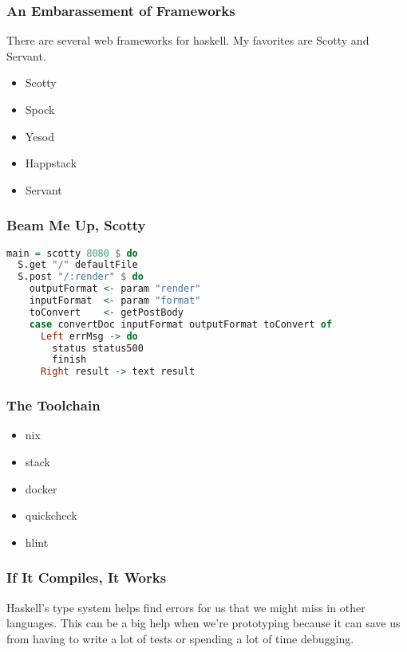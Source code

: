 \documentclass{beamer}
\begin{document}
\begin{frame}
  \frametitle{An Embarassement of Frameworks}
  There are several web frameworks for haskell.  My favorites are
  Scotty and Servant.
  \begin{itemize}
    \item Scotty
    \item Spock
    \item Yesod
    \item Happstack
    \item Servant
  \end{itemize}
\end{frame}

\begin{frame}[fragile]
  \frametitle{Beam Me Up, Scotty}
\begin{lstlisting}[language=haskell]
main = scotty 8080 $ do
  S.get "/" defaultFile
  S.post "/:render" $ do
    outputFormat <- param "render"
    inputFormat  <- param "format"
    toConvert    <- getPostBody
    case convertDoc inputFormat outputFormat toConvert of
      Left errMsg -> do
        status status500
        finish
      Right result -> text result
\end{lstlisting}
\end{frame}

\begin{frame}
  \frametitle{The Toolchain}
  \begin{itemize}
  \item nix
  \item stack
  \item docker
  \item quickcheck
  \item hlint
  \end{itemize}
\end{frame}

\begin{frame}
  \frametitle{If It Compiles, It Works}
  Haskell's type system helps find errors for us that we might miss in
  other languages.  This can be a big help when we're prototyping
  because it can save us from having to write a lot of tests or
  spending a lot of time debugging.
\end{frame}
\end{document}
